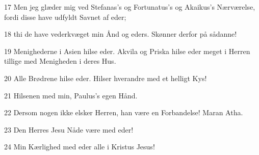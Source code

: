 \par 17 Men jeg glæder mig ved Stefanas's og Fortunatus's og Akaikus's Nærværelse, fordi disse have udfyldt Savnet af eder;
\par 18 thi de have vederkvæget min Ånd og eders. Skønner derfor på sådanne!
\par 19 Menighederne i Asien hilse eder. Akvila og Priska hilse eder meget i Herren tillige med Menigheden i deres Hus.
\par 20 Alle Brødrene hilse eder. Hilser hverandre med et helligt Kys!
\par 21 Hilsenen med min, Paulus's egen Hånd.
\par 22 Dersom nogen ikke elsker Herren, han være en Forbandelse! Maran Atha.
\par 23 Den Herres Jesu Nåde være med eder!
\par 24 Min Kærlighed med eder alle i Kristus Jesus!




